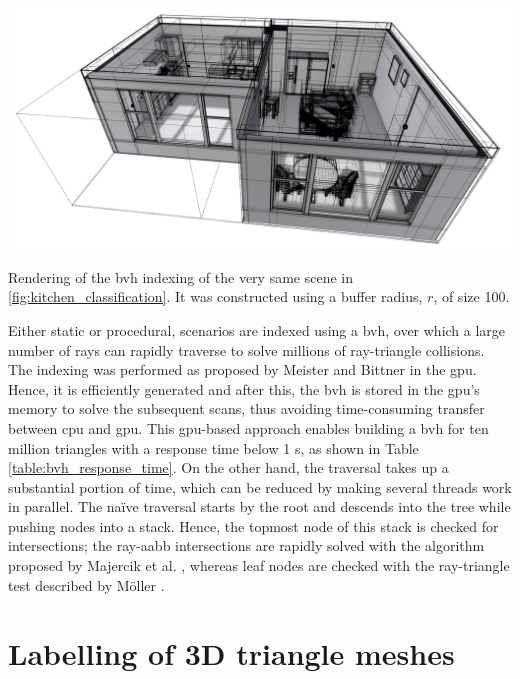 \begin{marginfigure}[.cm]
    \centering
    \includegraphics[width=\linewidth]{figs/lidar_simulation/bvh_rendering.png}
	\caption{Rendering of the \acrshort{bvh} indexing of the very same scene in \ref{fig:kitchen_classification}. It was constructed using a buffer radius, $r$, of size 100.}
	\label{fig:lidar_bvh_rendering}
\end{marginfigure}
Either static or procedural, scenarios are indexed using a \acrshort{bvh}, over which a large number of rays can rapidly traverse to solve millions of ray-triangle collisions. The indexing was performed as proposed by Meister and Bittner \cite{meister_parallel_2018} in the \acrshort{gpu}. Hence, it is efficiently generated and after this, the \acrshort{bvh} is stored in the \acrshort{gpu}'s memory to solve the subsequent scans, thus avoiding time-consuming transfer between \acrshort{cpu} and \acrshort{gpu}. This \acrshort{gpu}-based approach enables building a \acrshort{bvh} for ten million triangles with a response time below 1 \si{\second}, as shown in Table \ref{table:bvh_response_time}. On the other hand, the traversal takes up a substantial portion of time, which can be reduced by making several threads work in parallel. The naïve traversal starts by the root and descends into the tree while pushing nodes into a stack. Hence, the topmost node of this stack is checked for intersections; the ray-\acrshort{aabb} intersections are rapidly solved with the algorithm proposed by Majercik et al. \cite{majercik_ray-box_2018}, whereas leaf nodes are checked with the ray-triangle test described by Möller \cite{moller_fast_1997}.

\section{Labelling of 3D triangle meshes}

